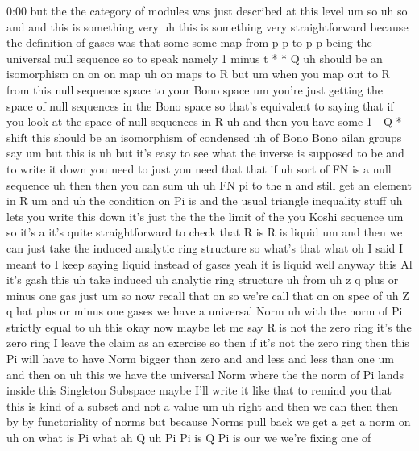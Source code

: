 \begin{unfinished}{0:00}
but  the  the  category  of  modules  was  just
described  at  this
level
um  so  uh  so  and  and  this  is  something
very  uh  this  is  something  very
straightforward  because  the  definition
of  gases  was  that  some  some  map  from  p  p
to  p  p  being  the  universal  null  sequence
so  to  speak  namely  1
minus  t  *  *  Q  uh  should  be  an
isomorphism  on  on  on  map  uh  on  maps  to
R  but  um  when  you  map  out  to  R  from  this
null  sequence  space  to  your  Bono  space
um  you're  just  getting  the  space  of  null
sequences  in  the  Bono  space  so  that's
equivalent  to  saying  that  if  you  look  at
the  space  of  null  sequences  in
R
uh  and  then  you  have  some  1  -  Q  *  shift
this  should  be  an  isomorphism  of
condensed  uh  of
Bono  Bono  ailan  groups  say  um  but  this
is  uh  but  it's  easy  to  see  what  the
inverse  is  supposed  to  be  and  to  write
it  down  you  need  to  just  you  need  that
that  if  uh  sort
of  FN  is  a  null
sequence  uh  then  then  you  can
sum
uh  uh  FN  pi  to  the  n  and  still  get  an
element  in
R
um  and  uh  the  condition  on  Pi  is  and  the
usual  triangle  inequality  stuff
uh  lets  you  write  this  down  it's  just
the  the  the  limit  of  the  you  Koshi
sequence  um  so  it's  a  it's  quite
straightforward  to  check  that  R
is  R  is  liquid  um  and  then  we  can  just
take  the  induced  analytic  ring  structure
so  what's  that
what  oh  I  said  I  meant  to  I  keep  saying
liquid  instead  of  gases  yeah  it  is
liquid  well  anyway  this  Al  it's  gash
this  uh  take  induced  uh  analytic  ring
structure  uh
from  uh  z  q  plus  or  minus  one  gas  just
um
so  now  recall  that  on  so  we're  call  that
on  on  spec  of  uh  Z  q  hat  plus  or  minus
one  gases  we  have  a  universal
Norm  uh  with  the  norm  of  Pi  strictly
equal  to  uh  this  okay  now  maybe  let  me
say  R  is  not  the  zero  ring  it's  the  zero
ring  I  leave  the  claim  as  an  exercise  so
then  if  it's  not  the  zero  ring  then  this
Pi  will  have  to  have  Norm  bigger  than
zero  and  and  less  and  less  than  one
um  and  then  on  uh  this  we  have  the
universal  Norm  where  the  the  norm  of  Pi
lands  inside  this  Singleton  Subspace
maybe  I'll  write  it  like  that  to  remind
you  that  this  is  kind  of  a  subset  and
not  a
value
um  uh  right  and  then  we  can  then  then  by
by  functoriality  of  norms  but  because
Norms  pull  back  we  get  a  get  a  norm
on  uh  on  what  is  Pi  what  ah  Q  uh  Pi  Pi
is  Q  Pi  is  our  we  we're  fixing  one  of

\end{unfinished}
